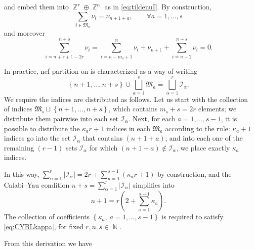 \documentclass[12pt,a4paper,oneside]{amsart}
\numberwithin{equation}{section}
\theoremstyle{definition}
\theoremstyle{remark}
\DeclareMathOperator{\N}{\mathbb{N}}
\DeclareMathOperator{\Z}{\mathbb{Z}}
\begin{document}
and embed them into $\Z^r \oplus \Z^n$ as in \eqref{eq:tildenuI}. By construction, 
\begin{equation}
\label{eq:BLblowupnu}
	\sum_{i \in \mathfrak{M}_a} \nu_{i} = \nu_{n+1+a} , \qquad \forall a=1, \dots, s 
\end{equation}
and moreover 
\begin{equation}
\label{eq:doublemirrorcond}
	\sum_{i=n+s+1-2r}^{n+s} \nu_i = \sum_{i=n-m_s+1}^{n} \nu_i  + \nu_{n+1} + \sum_{i=n+2}^{n+s} \nu_i =0 .
\end{equation}\par
In practice, nef partition on is characterized as a way of writing 
\begin{equation*}
	\left\{ n+1, \dots, n+s \right\} \cup \bigsqcup_{a=1}^{s} \mathfrak{M}_a = \bigsqcup_{\alpha=1}^{r} \mathcal{I}_{\alpha} .
\end{equation*}
We require the indices are distributed as follows. Let us start with the collection of indices $\mathfrak{M}_s \sqcup \left\{ n+1, \dots, n+s \right\} $, which contains $m_s +s=2r$ elements; we distribute them pairwise into each set $\mathcal{I}_{\alpha}$. Next, for each $a=1, \dots, s-1$, it is possible to distribute the $\kappa_a r+1$ indices in each $\mathfrak{M}_a$ according to the rule: $\kappa_a+1$ indices go into the set $\mathcal{I}_{\alpha}$ that contains $(n+1+a)$; and into each one of the remaining $(r-1)$ sets $\mathcal{I}_{\alpha} $ for which $(n+1+a) \notin \mathcal{I}_{\alpha}$, we place exactly $\kappa_a$ indices.\par 
In this way, $\sum_{\alpha=1}^r \lvert \mathcal{I}_{\alpha}\rvert = 2r + \sum_{a=1}^{s-1} (\kappa_a r+1)$ by construction, and the Calabi--Yau condition $n+s=\sum_{\alpha=1}^r \lvert \mathcal{I}_{\alpha}\rvert$ simplifies into 
\begin{equation}
\label{eq:CYBLkappa}
	n+1= r \left( 2+\sum_{a=1}^{s-1} \kappa_a \right) .
\end{equation}
The collection of coefficients $\left\{ \kappa_a , \ a=1, \dots, s -1\right\}$ is required to satisfy \eqref{eq:CYBLkappa}, for fixed $r,n,s \in \N$.\par
From this derivation we have
\end{document}
